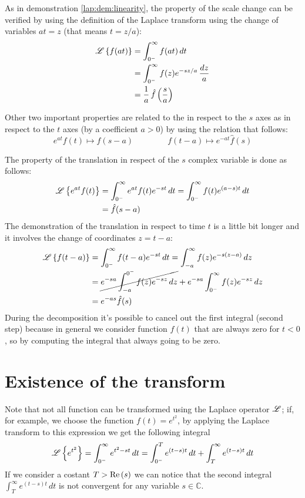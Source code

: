 	\begin{demonstration}
		As in demonstration \ref{lap:dem:linearity}, the property of the scale change can be verified by using the definition of the Laplace transform using the change of variables $at = z$ (that means $t= z/a$):
		\begin{align*}
			\mathscr{L} \left\{ f(at) \right\} & = \int_{0^-}^\infty f(at)\, dt \\
			& = \int_{0^-}^\infty f(z) e^{-sz/a} \, \frac{dz}{a} \\
			& = \frac 1 a \, \hat f\left(\frac s a\right)
		\end{align*}
	\end{demonstration}
		
	Other two important properties are related to the  in respect to the $s$ axes as in respect to the $t$ axes (by a coefficient $a>0$) by using the relation that follows:
	\begin{equation}
		e^{at} f(t) \mapsto \hat f(s-a) \qquad \, \qquad f(t-a) \mapsto e^{-at} \hat f(s)
	\end{equation}

	\begin{demonstration}
		The property of the translation in respect of the $s$ complex variable is done as follows:
		\begin{align*}
			\mathscr{L} \left\{ e^{at}f(t) \right\} & = \int_{0^-}^\infty e^{at} f(t) e^{-st} \, dt = \int_{0^-}^\infty f(t) e^{(a-s)t} \, dt \\ & = \hat f(s-a)
		\end{align*}
		The demonstration of the translation in respect to time $t$ is a little bit longer and it involves the change of coordinates $z = t-a$:
		\begin{align*}
			\mathscr{L} \left\{ f(t-a) \right\} & = \int_{0^-}^\infty f(t-a) e^{-st} \, dt = \int_{-a}^\infty f(z) e^{-s(z-a)} \, dz \\ 
			& = \cancel{e^{-sa} \int_{-a}^{0^-} f(z) e^{-sz}\, dz} + e^{-sa} \int_{0^-}^\infty f(z) e^{-sz}\, dz 
			\\ & = e^{-as} \hat f(s)
 		\end{align*} 
 		During the decomposition it's possible to cancel out the first integral (second step) because in general we consider function $f(t)$ that are always zero for $t<0$, so by computing the integral that always going to be zero. 
	\end{demonstration}
	
\section{Existence of the transform}
	Note that not all function can be transformed using the Laplace operator $\mathscr{L}$; if, for example, we choose the function $f(t) = e^{t^2}$, by applying the Laplace transform to this expression we get the following integral
	\[\mathscr{L} \left\{ e^{t^2} \right\} = \int_{0^-}^\infty e ^{t^2-st} \, dt = \int_{0^-}^T e^{(t-s)t}\, dt + \int_T^\infty e^{(t-s)t}\, dt  \]
	If we consider a costant $T > \textrm{Re}\left(s\right)$ we can notice that the second integral $\int_T^\infty e^{(t-s)t}\, dt$ is not convergent for any variable $s\in\mathds C$.
	
